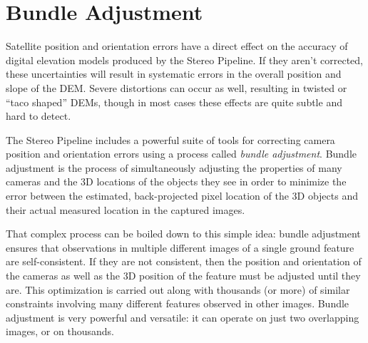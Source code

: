 \chapter{Bundle Adjustment}
\label{ch:bundle_adjustment}


Satellite position and orientation errors have a direct effect on the
accuracy of digital elevation models produced by the Stereo Pipeline.
If they aren't corrected, these uncertainties will result in
systematic errors in the overall position and slope of the \ac{DEM}.  Severe
distortions can occur as well, resulting in twisted or ``taco shaped''
\acp{DEM}, though in most cases these effects are quite subtle and hard to
detect.

The Stereo Pipeline includes a powerful suite of tools for correcting
camera position and orientation errors using a process called
\emph{bundle adjustment}.  Bundle adjustment is the process of
simultaneously adjusting the properties of many cameras and the 3D
locations of the objects they see in order to minimize the error
between the estimated, back-projected pixel location of the 3D
objects and their actual measured location in the captured images.

That complex process can be boiled down to this simple idea: bundle
adjustment ensures that observations in multiple different images of a
single ground feature are self-consistent. If they are not consistent,
then the position and orientation of the cameras as well as the 3D
position of the feature must be adjusted until they are.  This
optimization is carried out along with thousands (or more) of similar
constraints involving many different features observed in other
images.  Bundle adjustment is very powerful and versatile: it can
operate on just two overlapping images, or on thousands.

